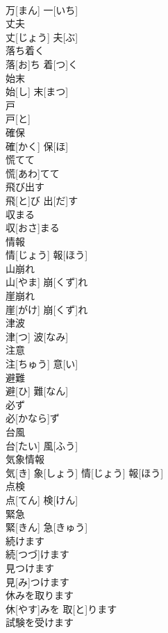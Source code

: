 \documentclass[8pt]{extreport}
\begin{document}
\begin{CJK}{UTF8}{min}
\\	万[まん] 一[いち]		
\\	丈夫	
\\	丈[じょう] 夫[ぶ]		
\\	落ち着く	
\\	落[お]ち 着[つ]く		
\\	始末	
\\	始[し] 末[まつ]		
\\	戸	
\\	戸[と]		
\\	確保	
\\	確[かく] 保[ほ]		
\\	慌てて	
\\	慌[あわ]てて		
\\	飛び出す	
\\	飛[と]び 出[だ]す		
\\	収まる	
\\	収[おさ]まる		
\\	情報	
\\	情[じょう] 報[ほう]		
\\	山崩れ	
\\	山[やま] 崩[くず]れ		
\\	崖崩れ	
\\	崖[がけ] 崩[くず]れ		
\\	津波	
\\	津[つ] 波[なみ]		
\\	注意	
\\	注[ちゅう] 意[い]		
\\	避難	
\\	避[ひ] 難[なん]		
\\	必ず	
\\	必[かなら]ず		
\\	台風	
\\	台[たい] 風[ふう]		
\\	気象情報	
\\	気[き] 象[しょう] 情[じょう] 報[ほう]		
\\	点検	
\\	点[てん] 検[けん]		
\\	緊急	
\\	緊[きん] 急[きゅう]		
\\	続けます	
\\	続[つづ]けます		
\\	見つけます	
\\	見[み]つけます		
\\	休みを取ります	
\\	休[やす]みを 取[と]ります		
\\	試験を受けます	

\end{CJK}
\end{document}

